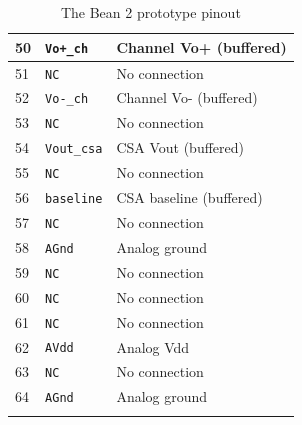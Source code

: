 \begin{center}
\begin{longtable}{|l|l|l|}
50 & \verb=Vo+_ch= & Channel Vo+ (buffered) \\\hline
51 & \verb=NC= & No connection \\\hline
52 & \verb=Vo-_ch= & Channel Vo- (buffered)\\\hline
53 & \verb=NC= & No connection \\\hline
54 & \verb=Vout_csa= & CSA Vout (buffered) \\\hline
55 & \verb=NC= & No connection \\\hline
56 & \verb=baseline= & CSA baseline (buffered) \\\hline
57 & \verb=NC= & No connection \\\hline
58 & \verb=AGnd= & Analog ground \\\hline
59 & \verb=NC= & No connection \\\hline
60 & \verb=NC= & No connection \\\hline
61 & \verb=NC= & No connection \\\hline
62 & \verb=AVdd= & Analog Vdd \\\hline
63 & \verb=NC= & No connection \\\hline
64 & \verb=AGnd= & Analog ground \\\hline
\caption{\label{pinout}The Bean 2 prototype pinout}
\end{longtable}
\end{center}












